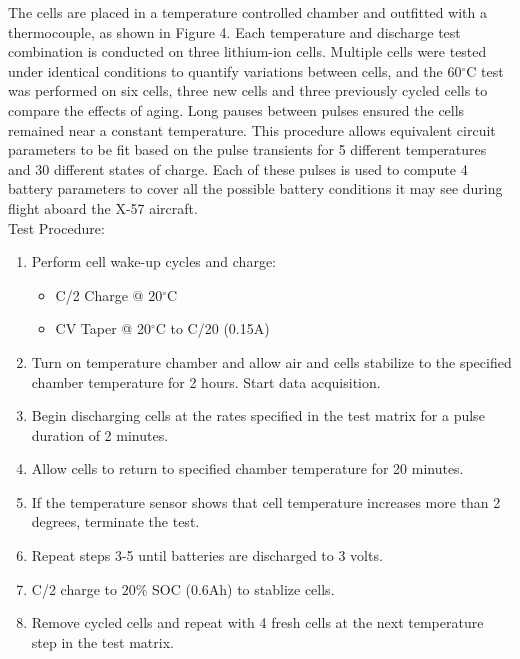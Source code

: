 \documentclass[]{aiaa-tc}%
\begin{document}
The cells are placed in a temperature controlled chamber and outfitted with a thermocouple, as shown in Figure 4. Each temperature and discharge test combination is conducted on three lithium-ion cells. Multiple cells were tested under identical conditions to quantify variations between cells, and the 60$^\circ$C test was performed on six cells, three new cells and three previously cycled cells to compare the effects of aging. Long pauses between pulses ensured the cells remained near a constant temperature. This procedure allows equivalent circuit parameters to be fit based on the pulse transients for 5 different temperatures and 30 different states of charge. Each of these pulses is used to compute 4 battery parameters to cover all the possible battery conditions it may see during flight aboard the X-57 aircraft. 
\\
Test Procedure:
\begin{enumerate}
\item Perform cell wake-up cycles and charge:
    \begin{itemize}
        \item C/2 Charge @ 20$^\circ$C
        \item CV Taper @ 20$^\circ$C to C/20 (0.15A)
    \end{itemize}
\item Turn on temperature chamber and allow air and cells stabilize to the specified chamber temperature for 2 hours. Start data acquisition.
\item  Begin discharging cells at the rates specified in the test matrix for a pulse duration of 2 minutes.
\item Allow cells to return to specified chamber temperature for 20 minutes.
\item If the temperature sensor shows that cell temperature increases more than 2 degrees, terminate the test.
\item Repeat steps 3-5 until batteries are discharged to 3 volts.
\item C/2 charge to $20\%$ SOC (0.6Ah) to stablize cells.
\item Remove cycled cells and repeat with 4 fresh cells at the next temperature step in the test matrix.
\end{enumerate}
\end{document}
